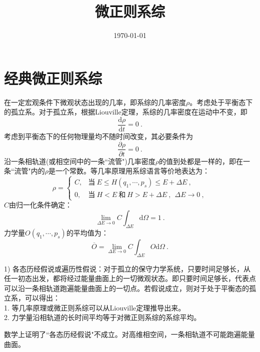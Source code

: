 \documentclass[12pt,a4paper]{article}
\title{微正则系综}
\author{}
\date{\today}
\newcommand{\dif}{\mathrm{d}}
\begin{document}
\maketitle

\section{经典微正则系综}
\cite{2013热力学} 在一定宏观条件下微观状态出现的几率，即系综的几率密度$\rho$。考虑处于平衡态下的孤立系。对于孤立系，根据Liouville定理，系综的几率密度在运动中不变，即
\begin{equation}
\dfrac{\dif \rho}{\dif t} = 0 ~.
\end{equation}
考虑到平衡态下的任何物理量均不随时间改变，其必要条件为
\begin{equation}
\dfrac{\partial \rho}{\partial t} = 0 ~.
\end{equation}
沿一条相轨道(或相空间中的一条``流管")几率密度$\rho$的值到处都是一样的，即在一条``流管"内的$\rho$是一个常数。等几率原理用系综语言等价地表达为：
\begin{equation}
\rho =\begin{cases}
C, & \text{当}~ E \leqslant H(q_1, \cdots, p_s) \leqslant E +\Delta E ~,\\
0, & \text{当}~ H < E ~\text{和}~ H > E +\Delta E ~, ~~ \Delta E \rightarrow 0 ~,
\end{cases}
\end{equation}
$C$由归一化条件确定：
\begin{equation}
\lim_{\Delta E \rightarrow 0} C \int_{\Delta E} \dif \Omega  =1 ~.
\end{equation}
力学量$O(q_1, \cdots, p_s)$的平均值为：
\begin{equation}
\overline{O} = \lim_{\Delta E \rightarrow 0} C \int_{\Delta E} O \dif \Omega ~.
\end{equation}






1) 各态历经假说或遍历性假说：对于孤立的保守力学系统，只要时间足够长，从任一初态出发，都将经过能量曲面上的一切微观状态。即只要时间足够长，代表点可以沿一条相轨道跑遍能量曲面上的一切点。若假说成立，则对于处于平衡态的孤立系，可以得出：\\
1. 等几率原理或微正则系综可以从Liouville定理推导出来。\\
2. 力学量沿相轨道的长时间平均等于对微正则系综的系综平均。

数学上证明了``各态历经假说"不成立。对高维相空间，一条相轨道不可能跑遍能量曲面。
\end{document}
